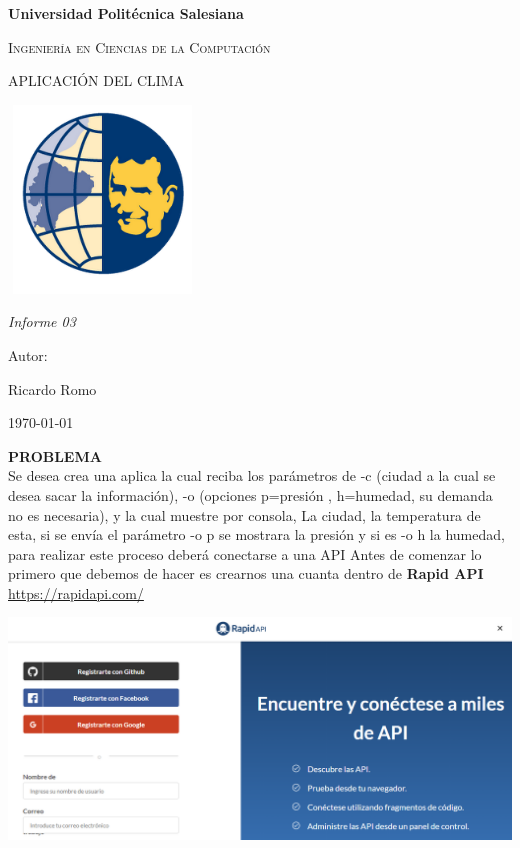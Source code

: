 \documentclass{report}
\begin{document}
\begin{titlepage}
    \centering
    {\bfseries\LARGE Universidad Politécnica Salesiana \par}
    \vspace{1cm}
    {\scshape\Large Ingeniería en Ciencias de la Computación \par}
    \vspace{3cm}
    {\scshape\Huge APLICACIÓN DEL CLIMA \par}
    \vspace{1cm}
    {\center\includegraphics[width=5cm, height=5cm]{ups1.png}\\}
    \vspace{1cm}
    {\itshape\Large Informe 03 \par}
    \vfill
    {\Large Autor: \par}
    {\Large Ricardo Romo \par}
    \vfill
    {\Large \today \par}
    \end{titlepage} 
    \textbf{PROBLEMA}   
    \\
    Se desea crea una aplica la cual reciba los parámetros de -c (ciudad a la cual se desea sacar la información), -o (opciones p=presión , h=humedad, su demanda no es necesaria), y la cual muestre por consola, La ciudad, la temperatura de esta, si se envía el parámetro -o p se mostrara la presión y si es -o h la humedad, para realizar este proceso deberá conectarse a una API
    Antes de comenzar lo primero que debemos de hacer es crearnos una cuanta dentro de \textbf{Rapid API} \url{https://rapidapi.com/}
    \begin{center}
        \includegraphics[scale=0.5]{rapid.PNG}
      \end{center}
\end{document}
